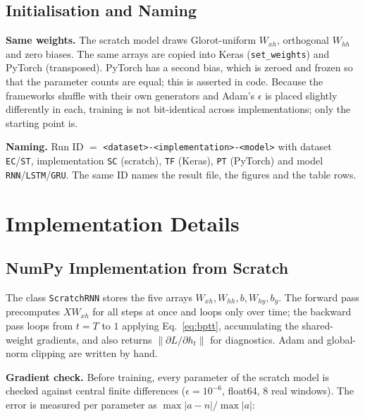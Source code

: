 \documentclass[11pt, a4paper]{article}
\newcommand{\run}[1]{\texttt{#1}}
\begin{document}
\subsection{Initialisation and Naming}

\textbf{Same weights.} The scratch model draws Glorot-uniform $W_{xh}$, orthogonal $W_{hh}$ and zero biases. The same arrays are copied into
Keras (\texttt{set\_weights}) and PyTorch (transposed). PyTorch has a second bias, which is zeroed and frozen so that the parameter
counts are equal; this is asserted in code. Because the frameworks shuffle with their own generators and Adam's $\epsilon$ is placed slightly
differently in each, training is not bit-identical across implementations; only the starting point is.

\textbf{Naming.} Run ID $=$ \run{<dataset>-<implementation>-<model>} with dataset \run{EC}/\run{ST}, implementation \run{SC} (scratch), \run{TF} (Keras),
\run{PT} (PyTorch) and model \run{RNN}/\run{LSTM}/\run{GRU}. The same ID names the result file, the figures and the table rows.

\section{Implementation Details}

\subsection{NumPy Implementation from Scratch}

The class \texttt{ScratchRNN} stores the five arrays $W_{xh},W_{hh},b,W_{hy},b_y$. The forward pass precomputes $X W_{xh}$ for all steps at once and
loops only over time; the backward pass loops from $t=T$ to $1$ applying Eq.~\eqref{eq:bptt}, accumulating the shared-weight gradients,
and also returns $\|\partial L/\partial h_t\|$ for diagnostics. Adam and global-norm clipping are written by hand.

\textbf{Gradient check.} Before training, every parameter of the scratch model is checked against central finite differences
($\epsilon=10^{-6}$, float64, 8 real windows). The error is measured per parameter as $\max|a-n|/\max|a|$:
\end{document}
